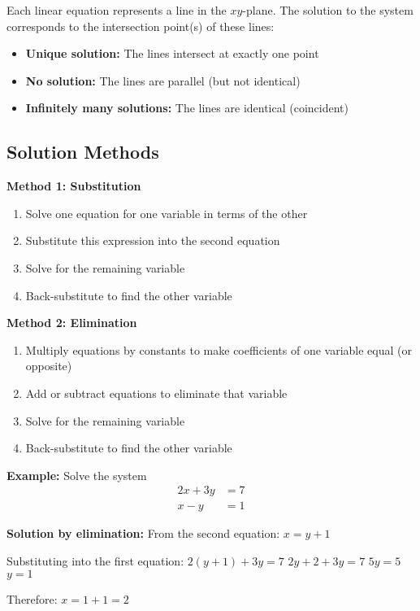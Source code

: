 \documentclass[12pt]{article}
\begin{document}
Each linear equation represents a line in the $xy$-plane. The solution to the system corresponds to the intersection point(s) of these lines:

\begin{itemize}
\item \textbf{Unique solution:} The lines intersect at exactly one point
\item \textbf{No solution:} The lines are parallel (but not identical)  
\item \textbf{Infinitely many solutions:} The lines are identical (coincident)
\end{itemize}

\subsection{Solution Methods}

\textbf{Method 1: Substitution}
\begin{enumerate}
\item Solve one equation for one variable in terms of the other
\item Substitute this expression into the second equation
\item Solve for the remaining variable
\item Back-substitute to find the other variable
\end{enumerate}

\textbf{Method 2: Elimination}
\begin{enumerate}
\item Multiply equations by constants to make coefficients of one variable equal (or opposite)
\item Add or subtract equations to eliminate that variable
\item Solve for the remaining variable
\item Back-substitute to find the other variable
\end{enumerate}

\textbf{Example:} Solve the system
\begin{align}
2x + 3y &= 7 \\
x - y &= 1
\end{align}

\textbf{Solution by elimination:}
From the second equation: $x = y + 1$

Substituting into the first equation:
$2(y + 1) + 3y = 7$
$2y + 2 + 3y = 7$
$5y = 5$
$y = 1$

Therefore: $x = 1 + 1 = 2$
\end{document}
